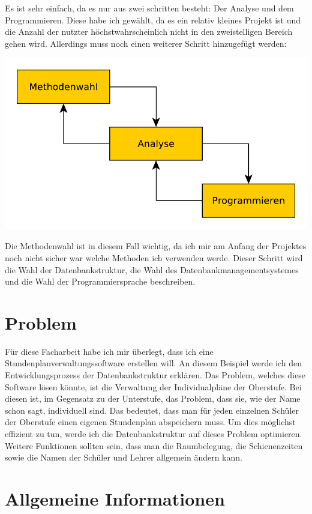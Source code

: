 \documentclass[a4paper, 12pt]{article}
\theoremstyle{plain}
\theoremstyle{definition}
\begin{document}
	Es ist sehr einfach, da es nur aus zwei schritten besteht: Der Analyse und dem Programmieren. Diese habe ich gewählt, da es ein relativ kleines Projekt ist und die Anzahl der nutzter höchstwahrscheinlich nicht in den zweistelligen Bereich gehen wird. Allerdings muss noch einen weiterer Schritt hinzugefügt werden:
	\begin{center}
	\includegraphics[scale=0.7]{newprojModell.pdf}
	\end{center}
	
	Die Methodenwahl ist in diesem Fall wichtig, da ich mir am Anfang der Projektes noch nicht sicher war welche Methoden ich verwenden werde. Dieser Schritt wird die Wahl der Datenbankstruktur, die Wahl des Datenbankmanagementsystemes und die Wahl der Programmiersprache beschreiben.
	\section{Problem}
	\label{sec:prob}
	Für diese Facharbeit habe ich mir überlegt, dass ich eine Stundenplanverwaltungssoftware erstellen will. An diesem Beispiel werde ich den Entwicklungsprozess der Datenbankstruktur erklären. Das Problem, welches diese Software lösen könnte, ist die Verwaltung der Individualpläne der Oberstufe. Bei diesen ist, im Gegensatz zu der Unterstufe, das Problem, dass sie, wie der Name schon sagt, individuell sind. Das bedeutet, dass man für jeden einzelnen Schüler der Oberstufe einen eigenen Stundenplan abspeichern muss. Um dies möglichst effizient zu tun, werde ich die Datenbankstruktur auf dieses Problem optimieren. Weitere Funktionen sollten sein, dass man die Raumbelegung, die Schienenzeiten sowie die Namen der Schüler und Lehrer allgemein ändern kann.	
	
	\section{Allgemeine Informationen}
	\label{sec:allgInfo}
	
\end{document}

